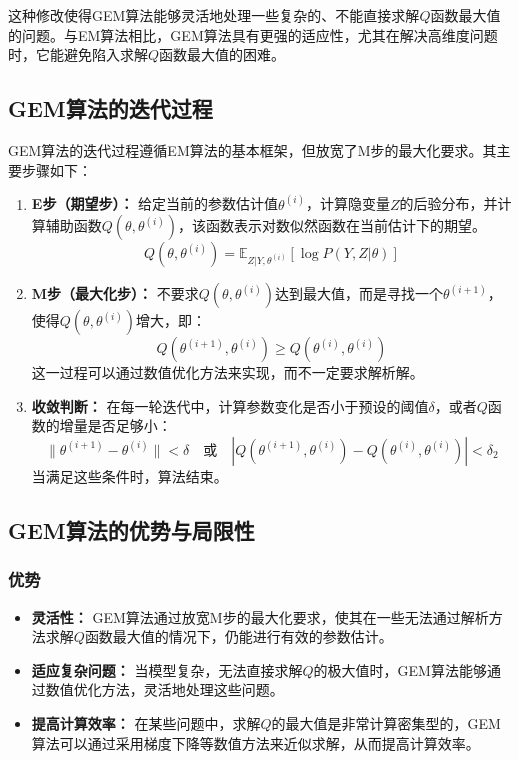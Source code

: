 \documentclass[a4paper,12pt]{ctexart} %
\begin{document}
这种修改使得GEM算法能够灵活地处理一些复杂的、不能直接求解$Q$函数最大值的问题。与EM算法相比，GEM算法具有更强的适应性，尤其在解决高维度问题时，它能避免陷入求解$Q$函数最大值的困难。

\subsection{GEM算法的迭代过程}

GEM算法的迭代过程遵循EM算法的基本框架，但放宽了M步的最大化要求。其主要步骤如下：

\begin{enumerate}
    \item \textbf{E步（期望步）：} 给定当前的参数估计值$\theta^{(i)}$，计算隐变量$Z$的后验分布，并计算辅助函数$Q(\theta, \theta^{(i)})$，该函数表示对数似然函数在当前估计下的期望。
    \begin{equation}
    Q(\theta, \theta^{(i)}) = \mathbb{E}_{Z|Y, \theta^{(i)}} [\log P(Y, Z | \theta)]
    \end{equation}
    
    \item \textbf{M步（最大化步）：} 不要求$Q(\theta, \theta^{(i)})$达到最大值，而是寻找一个$\theta^{(i+1)}$，使得$Q(\theta, \theta^{(i)})$增大，即：
    \begin{equation}
    Q(\theta^{(i+1)}, \theta^{(i)}) \geq Q(\theta^{(i)}, \theta^{(i)})
    \end{equation}
    这一过程可以通过数值优化方法来实现，而不一定要求解析解。
    
    \item \textbf{收敛判断：} 在每一轮迭代中，计算参数变化是否小于预设的阈值$\delta$，或者$Q$函数的增量是否足够小：
    \begin{equation}
    \|\theta^{(i+1)} - \theta^{(i)}\| < \delta
    \quad \text{或} \quad
    |Q(\theta^{(i+1)}, \theta^{(i)}) - Q(\theta^{(i)}, \theta^{(i)})| < \delta_2
    \end{equation}
    当满足这些条件时，算法结束。
\end{enumerate}

\subsection{GEM算法的优势与局限性}

\subsubsection{优势}
\begin{itemize}
    \item \textbf{灵活性：} GEM算法通过放宽M步的最大化要求，使其在一些无法通过解析方法求解$Q$函数最大值的情况下，仍能进行有效的参数估计。
    \item \textbf{适应复杂问题：} 当模型复杂，无法直接求解$Q$的极大值时，GEM算法能够通过数值优化方法，灵活地处理这些问题。
    \item \textbf{提高计算效率：} 在某些问题中，求解$Q$的最大值是非常计算密集型的，GEM算法可以通过采用梯度下降等数值方法来近似求解，从而提高计算效率。
\end{itemize}
\end{document}
